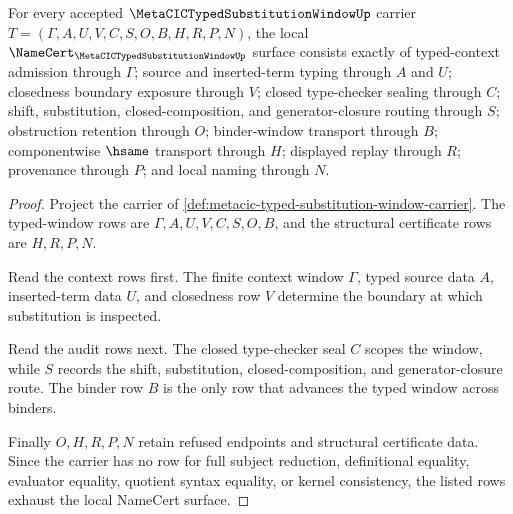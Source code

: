 \begin{theorem}
\label{thm:metacic-typed-substitution-window-namecert-obligations}
For every accepted $\MetaCICTypedSubstitutionWindowUp$ carrier $T=(\Gamma,A,U,V,C,S,O,B,H,R,P,N)$, the local $\NameCert_{\MetaCICTypedSubstitutionWindowUp}$ surface consists exactly of typed-context admission through $\Gamma$; source and inserted-term typing through $A$ and $U$; closedness boundary exposure through $V$; closed type-checker sealing through $C$; shift, substitution, closed-composition, and generator-closure routing through $S$; obstruction retention through $O$; binder-window transport through $B$; componentwise $\hsame$ transport through $H$; displayed replay through $R$; provenance through $P$; and local naming through $N$.
\end{theorem}
\begin{proof}
Project the carrier of \autoref{def:metacic-typed-substitution-window-carrier}. The typed-window rows are $\Gamma,A,U,V,C,S,O,B$, and the structural certificate rows are $H,R,P,N$.

Read the context rows first. The finite context window $\Gamma$, typed source data $A$, inserted-term data $U$, and closedness row $V$ determine the boundary at which substitution is inspected.

Read the audit rows next. The closed type-checker seal $C$ scopes the window, while $S$ records the shift, substitution, closed-composition, and generator-closure route. The binder row $B$ is the only row that advances the typed window across binders.

Finally $O,H,R,P,N$ retain refused endpoints and structural certificate data. Since the carrier has no row for full subject reduction, definitional equality, evaluator equality, quotient syntax equality, or kernel consistency, the listed rows exhaust the local NameCert surface.
\end{proof}

